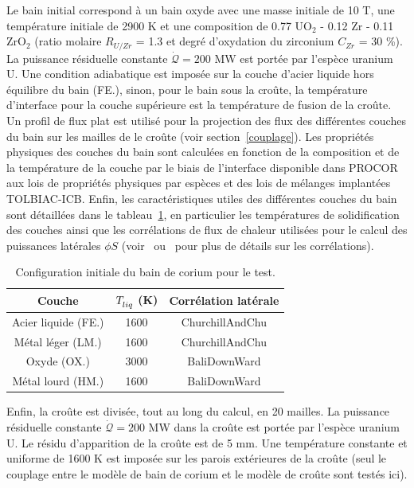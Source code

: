 Le bain initial correspond à un bain oxyde avec une masse initiale de 10 T, une température initiale de 2900 K et une composition de 0.77 UO$_2$ - 0.12 Zr - 0.11 ZrO$_2$ (ratio molaire $R_{U/Zr}$ = 1.3 et degré d'oxydation du zirconium $C_{Zr}$ = 30 \%). La puissance résiduelle constante $\dot{\mathcal{Q}} = 200$ MW est portée par l'espèce uranium U. Une condition adiabatique est imposée sur la couche d'acier liquide hors équilibre du bain (FE.), sinon, pour le bain sous la croûte, la température d'interface pour la couche supérieure est la température de fusion de la croûte. Un profil de flux plat est utilisé pour la projection des flux des différentes couches du bain sur les mailles de le croûte (voir section~\ref{couplage}). Les propriétés physiques des couches du bain sont calculées en fonction de la composition et de la température de la couche par le biais de l'interface disponible dans PROCOR aux lois de propriétés physiques par espèces et des lois de mélanges implantées TOLBIAC-ICB. Enfin, les caractéristiques utiles des différentes couches du bain sont détaillées dans le tableau~\ref{tab:caracteristiques_couches_bain}, en particulier les températures de solidification des couches ainsi que les corrélations de flux de chaleur utilisées pour le calcul des puissances latérales $\phi S$ (voir~\cite{Bonnet1999} ou~\cite{Tourniaire2009a} pour plus de détails sur les corrélations).
\begin{table}
	\centering
	\begin{tabular}{ccc} 
	\hline
	Couche & $\temperature{liq}$ (K) & Corrélation latérale\\
	\hline
	Acier liquide (FE.) & 1600 & ChurchillAndChu\\
	Métal léger (LM.) & 1600 & ChurchillAndChu\\
	Oxyde (OX.) & 3000 & BaliDownWard\\
	Métal lourd (HM.) & 1600 & BaliDownWard\\
	\hline
	\end{tabular}	
	\caption{Configuration initiale du bain de corium pour le test.} 
	\label{tab:caracteristiques_couches_bain}
\end{table}

Enfin, la croûte est divisée, tout au long du calcul, en 20 mailles. La puissance résiduelle constante $\dot{\mathcal{Q}} = 200$ MW dans la croûte est portée par l'espèce uranium U. Le résidu d'apparition de la croûte est de 5 mm. Une température constante et uniforme de 1600 K est imposée sur les parois extérieures de la croûte (seul le couplage entre le modèle de bain de corium et le modèle de croûte sont testés ici).

